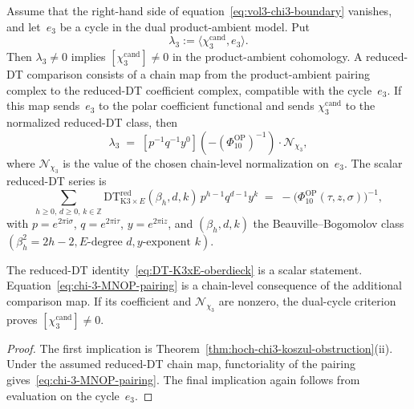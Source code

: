 \begin{proposition}%
\label{prop:chi-3-nonvanishing-MNOP}%
Assume that the right-hand side of
equation~\eqref{eq:vol3-chi3-boundary} vanishes, and let~$e_3$ be a
cycle in the dual product-ambient model.  Put
\begin{equation}
\label{eq:chi-3-explicit-rational-value}
 \lambda_3:=\langle\chi_3^{\mathrm{cand}},e_3\rangle.
\end{equation}
Then $\lambda_3\neq0$ implies
$[\chi_3^{\mathrm{cand}}]\neq0$ in the product-ambient cohomology.
A reduced-DT comparison consists of a chain map from the
product-ambient pairing complex to the reduced-DT coefficient complex,
compatible with the cycle~$e_3$.  If this map sends~$e_3$ to the polar
coefficient functional and sends $\chi_3^{\mathrm{cand}}$ to the
normalized reduced-DT class, then
\begin{equation}
\label{eq:chi-3-MNOP-pairing}
 \lambda_3
 \;=\;
 [p^{-1}q^{-1}y^0]\!\left(-(\Phi_{10}^{\mathrm{OP}})^{-1}\right)
 \cdot \mathcal N_{\chi_3},
\end{equation}
where $\mathcal N_{\chi_3}$ is the value of the chosen chain-level
normalization on~$e_3$.  The scalar reduced-DT series is
\begin{equation}
\label{eq:DT-K3xE-oberdieck}
 \sum_{h\ge 0,\,d\ge 0,\,k\in\mathbb Z}
 \mathrm{DT}^{\mathrm{red}}_{\mathrm{K3}\times E}
 (\beta_h,d,k)\,p^{h-1}q^{d-1}y^k
 \;=\;-\bigl(\Phi_{10}^{\mathrm{OP}}(\tau,z,\sigma)\bigr)^{-1},
\end{equation}
with $p=e^{2\pi\mathrm{i}\sigma}$, $q=e^{2\pi\mathrm{i}\tau}$,
$y=e^{2\pi\mathrm{i}z}$, and $(\beta_h,d,k)$ the
Beauville--Bogomolov class
$(\beta_h^2=2h-2,E\text{-degree }d,y\text{-exponent }k)$.

The reduced-DT identity~\eqref{eq:DT-K3xE-oberdieck} is a scalar
statement.  Equation~\eqref{eq:chi-3-MNOP-pairing} is a chain-level
consequence of the additional comparison map.  If its coefficient and
$\mathcal N_{\chi_3}$ are nonzero, the dual-cycle criterion proves
$[\chi_3^{\mathrm{cand}}]\neq0$.

\begin{proof}
The first implication is Theorem~\ref{thm:hoch-chi3-koszul-obstruction}(ii).
Under the assumed reduced-DT chain map, functoriality of the pairing
gives~\eqref{eq:chi-3-MNOP-pairing}.  The final implication again
follows from evaluation on the cycle~$e_3$.
\end{proof}
\end{proposition}

